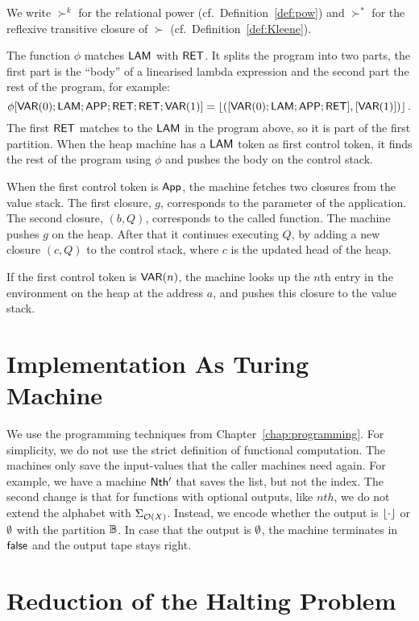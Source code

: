 We write $\succ^k$ for the relational power (cf.\ Definition~\ref{def:pow}) and $\succ^*$ for the reflexive transitive closure of $\succ$ (cf.\
Definition~\ref{def:Kleene}).

The function $\phi$ matches $\mathsf{LAM}$ with $\mathsf{RET}$.  It splits the program into two parts, the first part is the ``body'' of a linearised lambda
expression and the second part the rest of the program, for example:%
{\small
  \[
    \phi[\mathsf{VAR}(0); \mathsf{LAM}; \mathsf{APP}; \mathsf{RET}; \mathsf{RET}; \mathsf{VAR}(1)] = \left\lfloor {([\ensuremath{\mathsf{VAR}}(0); \ensuremath{\mathsf{LAM}}; \ensuremath{\mathsf{APP}}; \ensuremath{\mathsf{RET}}], [\ensuremath{\mathsf{VAR}}(1)])} \right\rfloor.
  \]
}%
The first $\mathsf{RET}$ matches to the $\mathsf{LAM}$ in the program above, so it is part of the first partition.  When the heap machine has a $\mathsf{LAM}$
token as first control token, it finds the rest of the program using $\phi$ and pushes the body on the control stack.

When the first control token is $\mathsf{App}$, the machine fetches two closures from the value stack.  The first closure, $g$, corresponds to the
parameter of the application.  The second closure, $(b,Q)$, corresponds to the called function.  The machine pushes $g$ on the heap.  After that it
continues executing $Q$, by adding a new closure $(c,Q)$ to the control stack, where $c$ is the updated head of the heap.

If the first control token is $\mathsf{VAR}(n)$, the machine looks up the $n$th entry in the environment on the heap at the address $a$, and pushes this
closure to the value stack.


\section{Implementation As Turing Machine}
\label{sec:heap-implementation}

We use the programming techniques from Chapter~\ref{chap:programming}.  For simplicity, we do not use the strict definition of functional computation.
The machines only save the input-values that the caller machines need again.  For example, we have a machine $\mathsf{Nth'}$ that saves the list, but not
the index.  The second change is that for functions with optional outputs, like $nth$, we do not extend the alphabet with $\Sigma_{\mathcal{O}(X)}$.
Instead, we encode whether the output is $\left\lfloor {\cdot} \right\rfloor$ or $\emptyset$ with the partition $\mathbb{B}$.  In case that the output is $\emptyset$, the machine
terminates in $\mathsf{false}$ and the output tape stays right.




\section{Reduction of the Halting Problem}
\label{sec:halting-problem}




